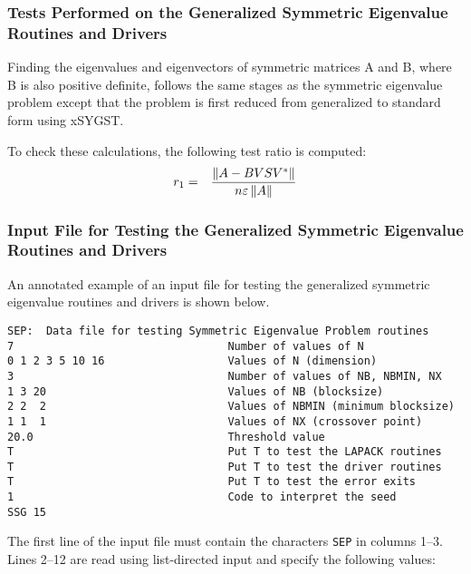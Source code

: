 \subsubsection{Tests Performed on the Generalized Symmetric Eigenvalue Routines
and Drivers}
Finding the eigenvalues and eigenvectors of symmetric matrices A and B,
where B is also positive definite, follows the same stages as the
symmetric eigenvalue problem except that the problem is first reduced from
generalized to standard form using xSYGST.

To check these calculations, the following test ratio is computed:
\begin{eqnarray}
        r_1&=&\frac{ \left\| A - B V S V^* \right\| }
                   { n \varepsilon \left\| A\right\| } \nonumber
\end{eqnarray}

\subsubsection{Input File for Testing the Generalized Symmetric Eigenvalue Routines and Drivers}

\dent
An annotated example of an input file for testing the generalized
symmetric eigenvalue routines and drivers is shown below.
\begin{verbatim}
SEP:  Data file for testing Symmetric Eigenvalue Problem routines
7                                 Number of values of N
0 1 2 3 5 10 16                   Values of N (dimension)
3                                 Number of values of NB, NBMIN, NX
1 3 20                            Values of NB (blocksize)
2 2  2                            Values of NBMIN (minimum blocksize)
1 1  1                            Values of NX (crossover point)
20.0                              Threshold value
T                                 Put T to test the LAPACK routines
T                                 Put T to test the driver routines
T                                 Put T to test the error exits
1                                 Code to interpret the seed
SSG 15
\end{verbatim}

The first line of the input file 
must contain the characters {\tt SEP} in columns 1--3.
Lines 2--12 are read using list-directed input and specify the following
values:

